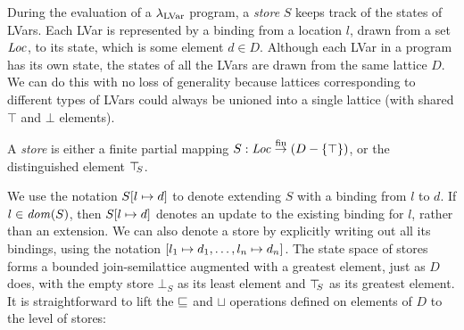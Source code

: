 



During the evaluation of a $\textup{\ensuremath{\lambda_{\textrm{LVar}}}}$ program, a \emph{store} $S$
keeps track of the states of LVars.  Each LVar is represented by a
binding from a location $l$, drawn from a set $\mathit{Loc}$, to its state,
which is some element $d \in D$.  Although each LVar in a program has
its own state, the states of all the LVars are drawn from the same
lattice $D$.  We can do this with no loss of generality because
lattices corresponding to different types of LVars could always be
unioned into a single lattice (with shared $\top$ and $\bot$
elements).

\begin{definition}\label{def:store}
A \emph{store} is either a finite partial mapping $S : \mathit{Loc} \stackrel{\textrm{fin}}{\rightarrow} (D-\lbrace \top \rbrace)$, or the distinguished element $\top\hspace{-0.85mm}_{S}$.
\end{definition}

\noindent We use the notation $S[l \mapsto d]$ to denote extending $S$
with a binding from $l$ to $d$.  If $l \in \mathit{dom}(S)$, then
$S[l \mapsto d]$ denotes an update to the existing binding for $l$,
rather than an extension.  We can also denote a store by explicitly
writing out all its bindings, using the notation
$\left[ l_1 \mapsto d_1, \dots, l_n \mapsto d_n \right]$.
%
The state space of stores forms a bounded join-semilattice
augmented with a greatest element, just as
$D$ does, with the empty store $\bot_S$ as its least element and $\top\hspace{-0.85mm}_{S}$ 
as its greatest element.
It is straightforward to lift the $\sqsubseteq$ and $\sqcup$ operations defined
on elements of $D$ to the level of stores:

